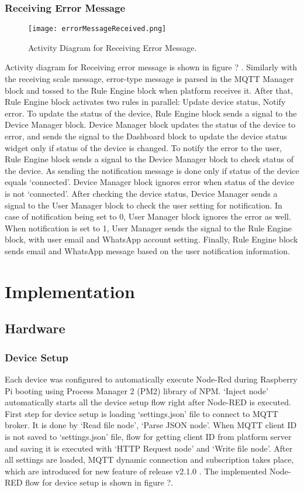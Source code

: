 \documentclass[conference]{IEEEtran}
\begin{document}
\subsubsection{Receiving Error Message}
\begin{figure}[htbp]
\centerline{\texttt{[image: errorMessageReceived.png]}}
\caption{Activity Diagram for Receiving Error Message.}
\label{fig}
\end{figure}
Activity diagram for Receiving error message is shown in figure ?
. Similarly with the receiving scale message, error-type message is parsed in the MQTT Manager block and tossed to the Rule Engine block when platform receives it. After that, Rule Engine block activates two rules in parallel: Update device status, Notify error. To update the status of the device, Rule Engine block sends a signal to the Device Manager block. Device Manager block updates the status of the device to error, and sends the signal to the Dashboard block to update the device status widget only if status of the device is changed. To notify the error to the user, Rule Engine block sends a signal to the Device Manager block to check status of the device. As sending the notification message is done only if status of the device equals ‘connected’. Device Manager block ignores error when status of the device is not ‘connected’. After checking the device status, Device Manager sends a signal to the User Manager block to check the user setting for notification. In case of notification being set to 0, User Manager block ignores the error as well. When notification is set to 1, User Manager sends the signal to the Rule Engine block, with user email and WhatsApp account setting. Finally, Rule Engine block sends email and WhatsApp message based on the user notification information.

\section{Implementation}
\subsection{Hardware}

\subsubsection{Device Setup}
Each device was configured to automatically execute Node-Red during Raspberry Pi booting using Process Manager 2 (PM2) library of NPM. ‘Inject node’ automatically starts all the device setup flow right after Node-RED is executed. First step for device setup is loading ‘settings.json’ file to connect to MQTT broker. It is done by ‘Read file node’, ‘Parse JSON node’. When MQTT client ID is not saved to ‘settings.json’ file, flow for getting client ID from platform server and saving it is executed with ‘HTTP Request node’ and ‘Write file node’. After all settings are loaded, MQTT dynamic connection and subscription takes place, which are introduced for new feature of release v2.1.0 \cite{b26}. The implemented Node-RED flow for device setup is shown in figure ?.
\end{document}
